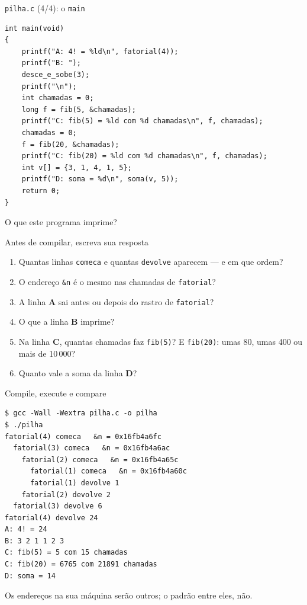 \documentclass[aspectratio=169]{beamer}
\begin{document}
\begin{frame}[fragile]{\texttt{pilha.c} (4/4): o \texttt{main}}
\begin{lstlisting}[style=codC]
int main(void)
{
    printf("A: 4! = %ld\n", fatorial(4));
    printf("B: ");
    desce_e_sobe(3);
    printf("\n");
    int chamadas = 0;
    long f = fib(5, &chamadas);
    printf("C: fib(5) = %ld com %d chamadas\n", f, chamadas);
    chamadas = 0;
    f = fib(20, &chamadas);
    printf("C: fib(20) = %ld com %d chamadas\n", f, chamadas);
    int v[] = {3, 1, 4, 1, 5};
    printf("D: soma = %d\n", soma(v, 5));
    return 0;
}
\end{lstlisting}
\end{frame}

\begin{frame}{O que este programa imprime?}
  \begin{block}{Antes de compilar, escreva sua resposta}
    \begin{enumerate}
      \item Quantas linhas \texttt{comeca} e quantas \texttt{devolve}
        aparecem --- e em que ordem?
      \item O endereço \texttt{\&n} é o mesmo nas chamadas de
        \texttt{fatorial}?
      \item A linha \textbf{A} sai antes ou depois do rastro de
        \texttt{fatorial}?
      \item O que a linha \textbf{B} imprime?
      \item Na linha \textbf{C}, quantas chamadas faz \texttt{fib(5)}? E
        \texttt{fib(20)}: umas 80, umas 400 ou mais de 10\,000?
      \item Quanto vale a soma da linha \textbf{D}?
    \end{enumerate}
  \end{block}
\end{frame}

\begin{frame}[fragile]{Compile, execute e compare}
\begin{lstlisting}[style=shellStyle]
$ gcc -Wall -Wextra pilha.c -o pilha
$ ./pilha
fatorial(4) comeca   &n = 0x16fb4a6fc
  fatorial(3) comeca   &n = 0x16fb4a6ac
    fatorial(2) comeca   &n = 0x16fb4a65c
      fatorial(1) comeca   &n = 0x16fb4a60c
      fatorial(1) devolve 1
    fatorial(2) devolve 2
  fatorial(3) devolve 6
fatorial(4) devolve 24
A: 4! = 24
B: 3 2 1 1 2 3
C: fib(5) = 5 com 15 chamadas
C: fib(20) = 6765 com 21891 chamadas
D: soma = 14
\end{lstlisting}
  \vspace{-0.4em}
  \begin{center}
    \scriptsize\textcolor{UFSGray}{Os endereços na sua máquina serão outros;
    o padrão entre eles, não.}
  \end{center}
\end{frame}
\end{document}
